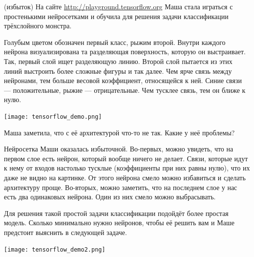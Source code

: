 

\newpage
\begin{problem}{(избыток)}
На сайте \url{http://playground.tensorflow.org} Маша стала играться с простенькими нейросетками и  обучила для решения задачи классификации трёхслойного монстра. 

Голубым цветом обозначен первый класс, рыжим второй. Внутри каждого нейрона визуализирована та разделяющая поверхность, которую он выстраивает. Так, первый слой ищет разделяющую линию. Второй слой пытается из этих линий выстроить более сложные фигуры и так далее. Чем ярче связь между нейронами, тем больше весовой коэффициент, относящейся к ней. Синие связи --- положительные, рыжие --- отрицательные. Чем тусклее связь, тем он ближе к нулю.

\begin{center} 
\texttt{[image: tensorflow\_demo.png]}
\end{center} 

Маша заметила, что с её архитектурой что-то не так. Какие у неё проблемы?
\end{problem} 

\begin{sol}
Нейросетка Маши оказалась избыточной. Во-первых, можно увидеть, что на первом слое есть нейрон, который вообще ничего не делает. Связи, которые идут к нему от входов настолько тусклые (коэффициенты при них равны нулю), что их даже не видно на картинке. От этого нейрона смело можно избавиться и сделать архитектуру проще.  Во-вторых, можно заметить, что на последнем слое у нас есть два одинаковых нейрона. Один из них смело можно выбрасывать. 

Для решения такой простой задачи классификации подойдёт более простая модель. Сколько минимально нужно нейронов, чтобы её решить вам и Маше предстоит выяснить в следующей задаче. 

\begin{center} 
\texttt{[image: tensorflow\_demo2.png]}
\end{center} 
\end{sol}


